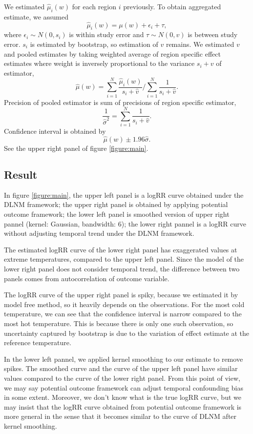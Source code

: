 \documentclass[12pt]{article}
\begin{document}
We estimated $\hat{\mu}_i(w)$ for each region $i$ previously.
To obtain aggregated estimate, we assumed
\[
	\hat{\mu}_i(w) = \mu(w) + \epsilon_i + \tau,
\]
where $\epsilon_i \sim N(0, s_i)$ is within study error and $\tau \sim N(0, v)$ is between study error.
$s_i$ is estimated by bootstrap,
so estimation of $v$ remains.
We estimated $v$ and pooled estimates
by taking weighted average of region specific effect estimates
where weight is inversely proportional to the variance $s_i + v$ of estimator,
\[
	\hat{\mu}(w) = \sum_{i = 1}^N \frac{\hat{\mu}_i(w)}{s_i + \hat{v}}
	/\sum_{i = 1}^N \frac{1}{s_i + \hat{v}}.
\]
Precision of pooled estimator is sum of precisions of region specific estimator,
\[
	\frac{1}{\hat{\sigma}^2} = \sum_{i = 1}^N \frac{1}{s_i + \hat{v}}.
\]
Confidence interval is obtained by 
\[
	\hat{\mu}(w) \pm 1.96 \hat{\sigma}.
\]
See the upper right panel of figure \ref{figure:main}.


\subsection{Result}

In figure \ref{figure:main},
the upper left panel is a logRR curve obtained under the DLNM framework;
the upper right panel is obtained by applying potential outcome framework;
the lower left panel is smoothed version of upper right pannel (kernel: Gaussian, bandwidth: $6$);
the lower right pannel is a logRR curve without adjusting temporal trend under the DLNM framework.

The estimated logRR curve of the lower right panel has exaggerated values at extreme temperatures,
compared to the upper left panel.
Since the model of the lower right panel does not consider temporal trend,
the difference between two panels comes from autocorrelation of outcome variable.

The logRR curve of the upper right panel is spiky,
because we estimated it by model free method, so it heavily depends on the observations.
For the most cold temperature, 
we can see that the confidence interval is narrow compared to the most hot temperature.
This is because there is only one such observation,
so uncertainty captured by bootstrap is due to the variation of effect estimate at the reference temperature.

In the lower left pannel, we applied kernel smoothing to our estimate to remove spikes.
The smoothed curve and the curve of the upper left panel have similar values 
compared to the curve of the lower right panel.
From this point of view, 
we may say potential outcome framework can adjust temporal confounding bias in some extent.
Moreover, we don't know what is the true logRR curve,
but we may insist that the logRR curve obtained from potential outcome framework is more general
in the sense that it becomes similar to the curve of DLNM after kernel smoothing.
\end{document}
